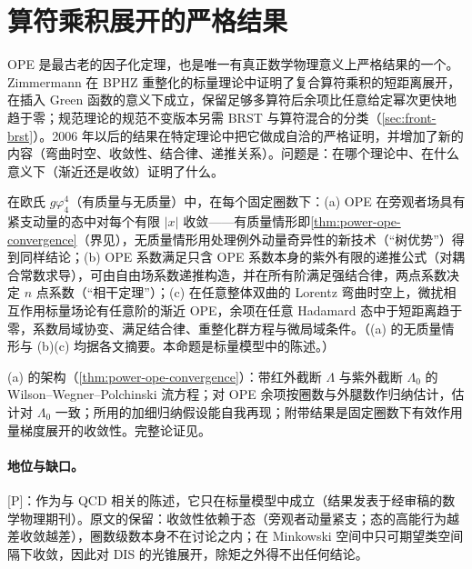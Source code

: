 \section{算符乘积展开的严格结果}\label{sec:front-ope}

OPE 是最古老的因子化定理，也是唯一有真正数学物理意义上严格结果的一个。Zimmermann 在 BPHZ 重整化的标量理论中证明了复合算符乘积的短距离展开，在插入 Green 函数的意义下成立，保留足够多算符后余项比任意给定幂次更快地趋于零\cite{Zimmermann1973}；规范理论的规范不变版本另需 BRST 与算符混合的分类（\cref{sec:front-brst}）。2006 年以后的结果在特定理论中把它做成自洽的严格证明，并增加了新的内容（弯曲时空、收敛性、结合律、递推关系）。问题是：在哪个理论中、在什么意义下（渐近还是收敛）证明了什么。

\begin{proposition}\label{prop:front-ope-scalar}
在欧氏 $g\varphi^4_4$（有质量与无质量）中，在每个固定圈数下：(a) OPE 在旁观者场具有紧支动量的态中对每个有限 $|x|$ 收敛——有质量情形即\cref{thm:power-ope-convergence}（界见\cite[式~(7)]{Hollands:2011gf}），无质量情形用处理例外动量奇异性的新技术（“树优势”）得到同样结论\cite{Holland:2014pna}；(b) OPE 系数满足只含 OPE 系数本身的紫外有限的递推公式（对耦合常数求导），可由自由场系数递推构造\cite{Holland:2014ifa}，并在所有阶满足强结合律，两点系数决定 $n$ 点系数（“相干定理”）\cite{Holland:2015tia}；(c) 在任意整体双曲的 Lorentz 弯曲时空上，微扰相互作用标量场论有任意阶的渐近 OPE，余项在任意 Hadamard 态中于短距离趋于零，系数局域协变、满足结合律、重整化群方程与微局域条件\cite{Hollands:2006ag}。（(a) 的无质量情形与 (b)(c) 均据各文摘要。本命题是标量模型中的陈述。）
\end{proposition}

\begin{proofsketch}
(a) 的架构（\cref{thm:power-ope-convergence}）：带红外截断 $\Lambda$ 与紫外截断 $\Lambda_0$ 的 Wilson--Wegner--Polchinski 流方程；对 OPE 余项按圈数与外腿数作归纳估计，估计对 $\Lambda_0$ 一致；所用的加细归纳假设能自我再现；附带结果是固定圈数下有效作用量梯度展开的收敛性。完整论证见\cite{Hollands:2011gf,Holland:2014pna}。
\end{proofsketch}

\paragraph{地位与缺口。}[P]：作为与 QCD 相关的陈述，它只在标量模型中成立（结果发表于经审稿的数学物理期刊）。原文的保留：收敛性依赖于态（旁观者动量紧支；态的高能行为越差收敛越差），圈数级数本身不在讨论之内；在 Minkowski 空间中只可期望类空间隔下收敛，因此对 DIS 的光锥展开，除矩之外得不出任何结论。

